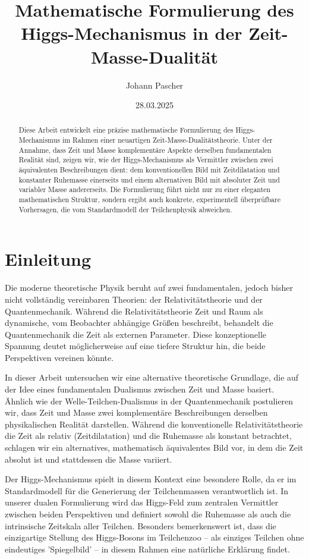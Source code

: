 \documentclass[a4paper,12pt]{article}
\title{Mathematische Formulierung des Higgs-Mechanismus in der Zeit-Masse-Dualität}
\author{Johann Pascher}
\date{28.03.2025}
\begin{document}
	
	\maketitle
	
	\tableofcontents
	\clearpage
	
	\begin{abstract}
		Diese Arbeit entwickelt eine präzise mathematische Formulierung des Higgs-Mechanismus im Rahmen einer neuartigen Zeit-Masse-Dualitätstheorie. Unter der Annahme, dass Zeit und Masse komplementäre Aspekte derselben fundamentalen Realität sind, zeigen wir, wie der Higgs-Mechanismus als Vermittler zwischen zwei äquivalenten Beschreibungen dient: dem konventionellen Bild mit Zeitdilatation und konstanter Ruhemasse einerseits und einem alternativen Bild mit absoluter Zeit und variabler Masse andererseits. Die Formulierung führt nicht nur zu einer eleganten mathematischen Struktur, sondern ergibt auch konkrete, experimentell überprüfbare Vorhersagen, die vom Standardmodell der Teilchenphysik abweichen.
	\end{abstract}
	
	\section*{Einleitung}
	
	Die moderne theoretische Physik beruht auf zwei fundamentalen, jedoch bisher nicht vollständig vereinbaren Theorien: der Relativitätstheorie und der Quantenmechanik. Während die Relativitätstheorie Zeit und Raum als dynamische, vom Beobachter abhängige Größen beschreibt, behandelt die Quantenmechanik die Zeit als externen Parameter. Diese konzeptionelle Spannung deutet möglicherweise auf eine tiefere Struktur hin, die beide Perspektiven vereinen könnte.
	
	In dieser Arbeit untersuchen wir eine alternative theoretische Grundlage, die auf der Idee eines fundamentalen Dualismus zwischen Zeit und Masse basiert. Ähnlich wie der Welle-Teilchen-Dualismus in der Quantenmechanik postulieren wir, dass Zeit und Masse zwei komplementäre Beschreibungen derselben physikalischen Realität darstellen. Während die konventionelle Relativitätstheorie die Zeit als relativ (Zeitdilatation) und die Ruhemasse als konstant betrachtet, schlagen wir ein alternatives, mathematisch äquivalentes Bild vor, in dem die Zeit absolut ist und stattdessen die Masse variiert.
	
	Der Higgs-Mechanismus spielt in diesem Kontext eine besondere Rolle, da er im Standardmodell für die Generierung der Teilchenmassen verantwortlich ist. In unserer dualen Formulierung wird das Higgs-Feld zum zentralen Vermittler zwischen beiden Perspektiven und definiert sowohl die Ruhemasse als auch die intrinsische Zeitskala aller Teilchen. Besonders bemerkenswert ist, dass die einzigartige Stellung des Higgs-Bosons im Teilchenzoo – als einziges Teilchen ohne eindeutiges 'Spiegelbild' – in diesem Rahmen eine natürliche Erklärung findet.
	
\end{document}
